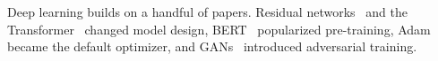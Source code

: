 \documentclass{article}
\begin{document}
Deep learning builds on a handful of papers.
Residual networks~\cite{he2016deep} and the Transformer~\cite{vaswani2017attention}
changed model design, BERT~\cite{devlin2019bert} popularized pre-training,
Adam~\cite{kingma2015adam} became the default optimizer, and
GANs~\cite{goodfellow2014generative} introduced adversarial training.



\end{document}
